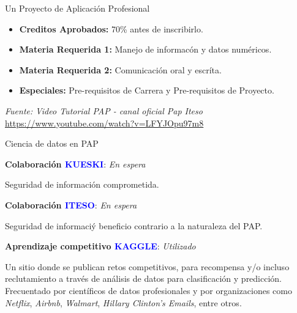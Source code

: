 \documentclass{bredelebeamer}
\begin{document}
\begin{frame}{Un Proyecto de Aplicaci\'on Profesional}

\begin{itemize}

  \item \textbf{Creditos Aprobados:} 70\% antes de inscribirlo.
  \item \textbf{Materia Requerida 1:} Manejo de informac\'on y datos num\'ericos.
  \item \textbf{Materia Requerida 2:} Comunicaci\'on oral y escr\'ita.
  \item \textbf{Especiales:} Pre-requisitos de Carrera y Pre-requisitos de Proyecto.

\end{itemize}

\vspace{1cm}

\textit{Fuente:}  \textit{Video Tutorial PAP - canal oficial Pap Iteso} \\
\textcolor{blue}{\href{https://www.youtube.com/watch?v=LFYJOpu97m8}{https://www.youtube.com/watch?v=LFYJOpu97m8}}

\end{frame}


\begin{frame}{Ciencia de datos en PAP}

\justifying

\textbf{Colaboraci\'on \textcolor{blue}{KUESKI}}: \textit{En espera} \\
\vspace{.2cm}

Seguridad de informaci\'on comprometida.

\vspace{.75cm}
  
\textbf{Colaboraci\'on \textcolor{blue}{ITESO}}: \textit{En espera} \\
\vspace{.2cm}

Seguridad de informaci\'y beneficio contrario a la naturaleza del PAP.

\vspace{.75cm}

\textbf{Aprendizaje competitivo \textcolor{blue}{KAGGLE}}: \textit{Utilizado} \\
\vspace{.2cm}

Un sitio donde se publican retos competitivos, para
recompensa y/o incluso reclutamiento a trav\'es de an\'alisis de datos para 
clasificaci\'on y predicci\'on. Frecuentado por cient\'ificos de datos profesionales
y por organizaciones como \textit{Netflix}, \textit{Airbnb},
\textit{Walmart}, \textit{Hillary Clinton's Emails}, entre otros.

\end{frame}
\end{document}
